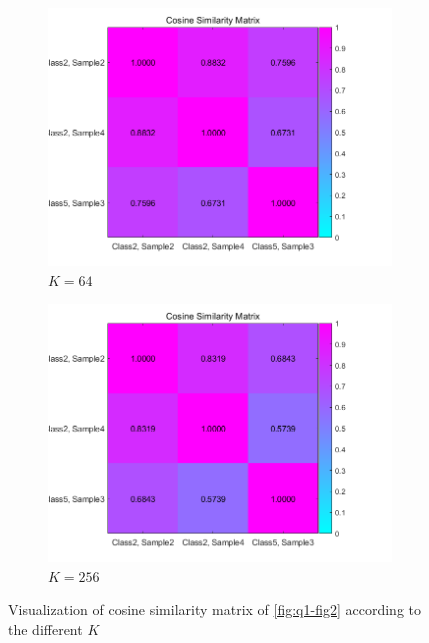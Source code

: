 \begin{figure}[htbp]
\begin{subfigure}[t]{0.25\linewidth}
		\includegraphics[width=\linewidth]{image/q1-appendix/similarity_64.png} 
		\caption{$K=64$}
	\end{subfigure}%
	\hfill
	\begin{subfigure}[t]{0.25\linewidth}
		\centering
		\includegraphics[width=\linewidth]{image/q1-appendix/similarity_256.png} 
		\caption{$K=256$}
	\end{subfigure}%
	\caption{Visualization of cosine similarity matrix of \cref{fig:q1-fig2} according to the different $K$}
	\label{fig:q1_cossim}
\end{figure}

